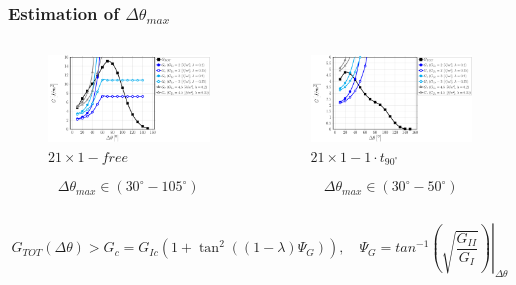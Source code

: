 \documentclass[first,firstsupp,lastsupp,last,hyperref,table]{ETHclass}
\begin{document}
\begin{frame}
\frametitle{\vspace{0.2cm}\small Estimation of $\Delta\theta_{max}$}
\vspace{-1.25cm}
\centering
\begin{columns}[c]
\centering
\begin{column}{0.5\textwidth}
\centering
\begin{figure}
\centering
\caption{\scriptsize $21\times 1-free$}
\includegraphics[width=\columnwidth]{vf60-dsize-S10A0.pdf}
\end{figure}
\scriptsize
\begin{equation*}
\Delta\theta_{max}\in\left(30^{\circ}-105^{\circ}\right)
\end{equation*}
\end{column}
\begin{column}{0.5\textwidth}
\centering
\begin{figure}
\centering
\caption{\scriptsize$21\times 1-1\cdot t_{90^{\circ}}$}
\includegraphics[width=\columnwidth]{vf60-dsize-S10A0T1.pdf}
\end{figure}
\scriptsize
\begin{equation*}
\Delta\theta_{max}\in\left(30^{\circ}-50^{\circ}\right)
\end{equation*}
\end{column}
\end{columns}
\scriptsize
\vspace{0.25cm}
\begin{equation*}
G_{TOT}\left(\Delta\theta\right)>G_{c}=G_{Ic}\left(1+\tan^{2}\left(\left(1-\lambda\right)\Psi_{G}\right)\right),\quad\Psi_{G}=\left.tan^{-1}\left(\sqrt{\frac{G_{II}}{G_{I}}}\right)\right|_{\Delta\theta}
\end{equation*}
\end{frame}
\end{document}
